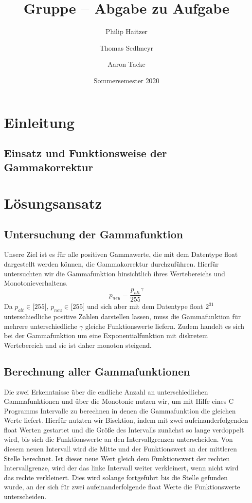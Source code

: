 \documentclass[course=erap]{aspdoc}
\author{Philip Haitzer \and Thomas Sedlmeyr \and Aaron Tacke}
\date{Sommersemester 2020} %
\title{Gruppe \theGroup{} -- Abgabe zu Aufgabe \theNumber}
\begin{document}
\maketitle

\section{Einleitung}
\subsection{Einsatz und Funktionsweise der Gammakorrektur}


\section{Lösungsansatz}
\subsection{Untersuchung der Gammafunktion}
Unsere Ziel ist es für alle positiven Gammawerte, die mit dem Datentype float dargestellt werden können, die Gammakorrektur durchzuführen. Hierfür untersuchten wir die Gammafunktion hinsichtlich ihres Wertebereichs und Monotonieverhaltens.
\begin{equation}
p_{neu} = \frac{p_{alt}}{255}^{\gamma}
\end{equation}   
Da $p_{alt} \in \lbrack255\rbrack$, $p_{neu} \in \lbrack255\rbrack$ und sich aber mit dem Datentype float $2^{31}$ unterschiedliche positive Zahlen darstellen lassen, muss die Gammafunktion für mehrere unterschiedliche $\gamma$ gleiche Funktionswerte liefern. Zudem handelt es sich bei der Gammafunktion um eine Exponentialfunktion mit diskretem Wertebereich und sie ist daher monoton steigend. 
\subsection{Berechnung aller Gammafunktionen}
Die zwei Erkenntnisse über die endliche Anzahl an unterschiedlichen Gammafunktionen und über die Monotonie nutzen wir, um mit Hilfe eines C Programms Intervalle zu berechnen in denen die Gammafunktion die gleichen Werte liefert. Hierfür nutzten wir Bisektion, indem mit zwei aufeinanderfolgenden float Werten gestartet und die Größe des Intervalls zunächst so lange verdoppelt wird, bis sich die Funktionswerte an den Intervallgrenzen unterscheiden. Von diesem neuen Intervall wird die Mitte und der Funktionswert an der mittleren Stelle berechnet. Ist dieser neue Wert gleich dem Funktionswert der rechten Intervallgrenze, wird der das linke Intervall weiter verkleinert, wenn nicht wird das rechte verkleinert. Dies wird solange fortgeführt bis die Stelle gefunden wurde, an der sich für zwei aufeinanderfolgende float Werte die Funktionswerte unterscheiden.      
\end{document}
